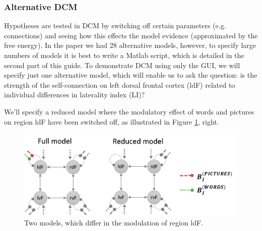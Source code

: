 \documentclass{article}
\begin{document}
\subsubsection{Alternative DCM} \label{GUI_altDCM}
Hypotheses are tested in DCM by switching off certain parameters (e.g. connections) and seeing how this effects the model evidence (approximated by the free energy). In the paper we had 28 alternative models, however, to specify large numbers of models it is best to write a Matlab script, which is detailed in the second part of this guide. To demonstrate DCM using only the GUI, we will specify just one alternative model, which will enable us to ask the question: is the strength of the self-connection on left dorsal frontal cortex (ldF) related to individual differences in laterality index (LI)?

We'll specify a reduced model where the modulatory effect of words and pictures on region ldF have been switched off, as illustrated in Figure \ref{Fig_dcm_spec_2models}, right.

\begin{figure}[ht]
\begin{center}
\includegraphics{"Fig_dcm_spec_2models"}
\caption{Two models, which differ in the modulation of region ldF.\label{Fig_dcm_spec_2models}}
\end{center}
\end{figure}
\end{document}
